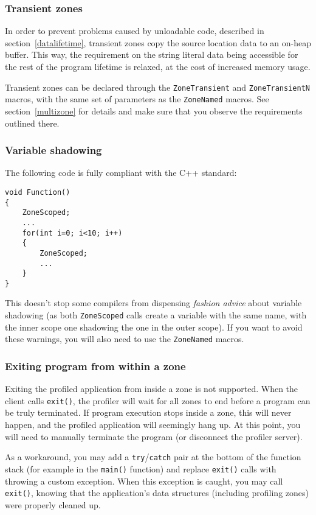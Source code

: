 \documentclass[hidelinks,titlepage,a4paper,twoside]{article}
\begin{document}
\subsubsection{Transient zones}
\label{transientzones}

In order to prevent problems caused by unloadable code, described in section~\ref{datalifetime}, transient zones copy the source location data to an on-heap buffer. This way, the requirement on the string literal data being accessible for the rest of the program lifetime is relaxed, at the cost of increased memory usage.

Transient zones can be declared through the \texttt{ZoneTransient} and \texttt{ZoneTransientN} macros, with the same set of parameters as the \texttt{ZoneNamed} macros. See section~\ref{multizone} for details and make sure that you observe the requirements outlined there.

\subsubsection{Variable shadowing}

The following code is fully compliant with the C++ standard:

\begin{lstlisting}
void Function()
{
	ZoneScoped;
	...
	for(int i=0; i<10; i++)
	{
		ZoneScoped;
		...
	}
}
\end{lstlisting}

This doesn't stop some compilers from dispensing \emph{fashion advice} about variable shadowing (as both \texttt{ZoneScoped} calls create a variable with the same name, with the inner scope one shadowing the one in the outer scope). If you want to avoid these warnings, you will also need to use the \texttt{ZoneNamed} macros.

\subsubsection{Exiting program from within a zone}

Exiting the profiled application from inside a zone is not supported. When the client calls \texttt{exit()}, the profiler will wait for all zones to end before a program can be truly terminated. If program execution stops inside a zone, this will never happen, and the profiled application will seemingly hang up. At this point, you will need to manually terminate the program (or disconnect the profiler server).

As a workaround, you may add a \texttt{try}/\texttt{catch} pair at the bottom of the function stack (for example in the \texttt{main()} function) and replace \texttt{exit()} calls with throwing a custom exception. When this exception is caught, you may call \texttt{exit()}, knowing that the application's data structures (including profiling zones) were properly cleaned up.
\end{document}
